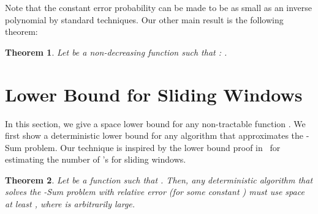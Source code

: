 \documentclass[11pt]{article}
\newtheorem{thm}{Theorem}
\begin{document}
\noindent Note that the constant error probability can be made to be as small as an inverse polynomial
by standard techniques.  Our other main result is the following theorem:
\begin{thm}\label{thm:zeroone}
Let  be a non-decreasing function such that :
.
\end{thm}

\section{Lower Bound for Sliding Windows}
\label{sec:lb}

In this section, we give a space lower bound for any non-tractable function .
We first show a deterministic lower bound for any algorithm that
approximates the -Sum problem.  Our technique is inspired by the lower bound proof in~\cite{DGIM02} for
estimating the number of 's for sliding windows.

\begin{thm}
Let  be a function such that .  Then, any deterministic algorithm that
solves the -Sum problem with relative error  (for some constant ) must
use space at least , where  is arbitrarily large.
\end{thm}
\end{document}
